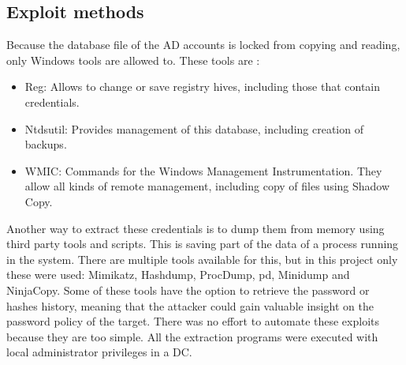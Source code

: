 \subsection{Exploit methods}
Because the database file of the AD accounts is locked from copying and reading, only Windows tools are allowed to. These tools are \cite{dump_ways}:
\begin{itemize}
	\item Reg: Allows to change or save registry hives, including those that contain credentials.
	\item Ntdsutil: Provides management of this database, including creation of backups.
	\item WMIC: Commands for the Windows Management Instrumentation. They allow all kinds of remote management, including copy of files using Shadow Copy.
\end{itemize}
Another way to extract these credentials is to dump them from memory using third party tools and scripts. This is saving part of the data of a process running in the system\cite{dump_ways}.
There are multiple tools available for this, but in this project only these were used: Mimikatz, Hashdump, ProcDump, pd, Minidump and NinjaCopy.
\linej
Some of these tools have the option to retrieve the password or hashes history, meaning that the attacker could gain valuable insight on the password policy of the target.
\linej
\linej
There was no effort to automate these exploits because they are too simple.
All the extraction programs were executed with local administrator privileges in a DC.

